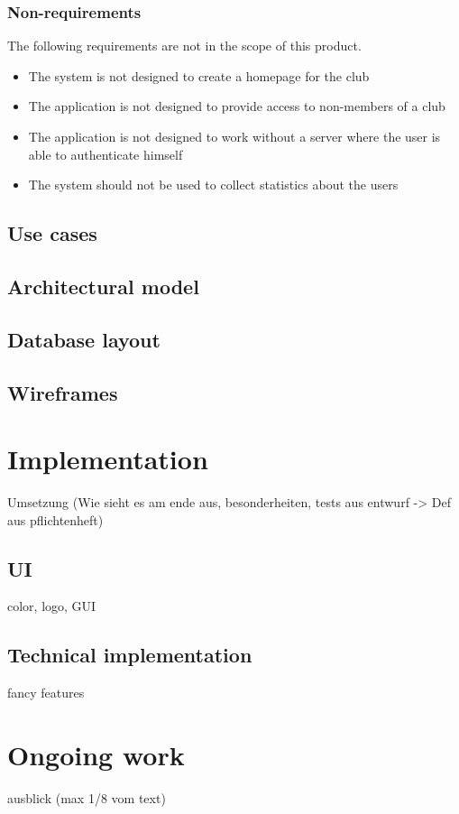 \subsection{Non-requirements} %
The following requirements are not in the scope of this product.
\begin{itemize}
\item The system is not designed to create a homepage for the club
\item The application is not designed to provide access to non-members of a club
\item The application is not designed to work without a server where the user is able to authenticate himself
\item The system should not be used to collect statistics about the users
\end{itemize}

\section{Use cases}

\section{Architectural model}

\section{Database layout}

\section{Wireframes}
\label{sec:Wireframes}

\chapter{Implementation}
Umsetzung (Wie sieht es am ende aus, besonderheiten, tests aus entwurf -> Def aus pflichtenheft)

\section{UI}
color, logo, GUI

\label{sec:GUI}

\section{Technical implementation}

fancy features

\chapter{Ongoing work}
\label{chapter:OngoingWork}
ausblick (max 1/8 vom text)

